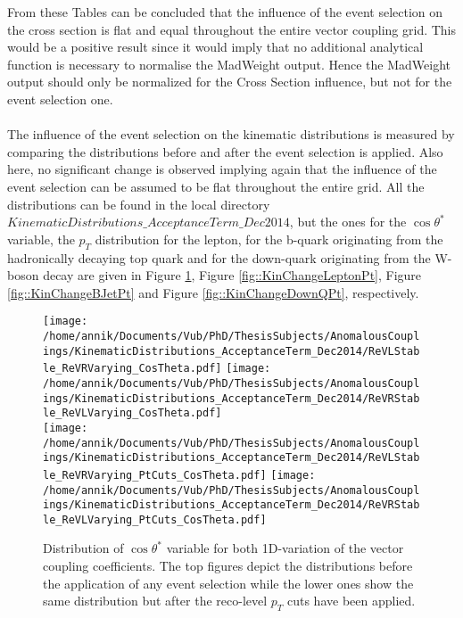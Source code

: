 From these Tables can be concluded that the influence of the event selection on the cross section is flat and equal throughout the entire vector coupling grid. This would be a positive result since it would imply that no additional analytical function is necessary to normalise the MadWeight output. Hence the MadWeight output should only be normalized for the Cross Section influence, but not for the event selection one.\\
\\
The influence of the event selection on the kinematic distributions is measured by comparing the distributions before and after the event selection is applied. Also here, no significant change is observed implying again that the influence of the event selection can be assumed to be flat throughout the entire grid. All the distributions can be found in the local directory $KinematicDistributions\_AcceptanceTerm\_Dec2014$, but the ones for the $\cos \theta^{*}$ variable, the $p_T$ distribution for the lepton, for the b-quark originating from the hadronically decaying top quark and for the down-quark originating from the W-boson decay are given in Figure \ref{fig::KinChangeCosTheta}, Figure \ref{fig::KinChangeLeptonPt}, Figure \ref{fig::KinChangeBJetPt} and Figure \ref{fig::KinChangeDownQPt}, respectively.\\
\begin{figure}[!h]
 \centering
 \texttt{[image: /home/annik/Documents/Vub/PhD/ThesisSubjects/AnomalousCouplings/KinematicDistributions\_AcceptanceTerm\_Dec2014/ReVLStable\_ReVRVarying\_CosTheta.pdf]}
 \texttt{[image: /home/annik/Documents/Vub/PhD/ThesisSubjects/AnomalousCouplings/KinematicDistributions\_AcceptanceTerm\_Dec2014/ReVRStable\_ReVLVarying\_CosTheta.pdf]}\\
 \texttt{[image: /home/annik/Documents/Vub/PhD/ThesisSubjects/AnomalousCouplings/KinematicDistributions\_AcceptanceTerm\_Dec2014/ReVLStable\_ReVRVarying\_PtCuts\_CosTheta.pdf]}
 \texttt{[image: /home/annik/Documents/Vub/PhD/ThesisSubjects/AnomalousCouplings/KinematicDistributions\_AcceptanceTerm\_Dec2014/ReVRStable\_ReVLVarying\_PtCuts\_CosTheta.pdf]}
 \caption{Distribution of $\cos \theta^{*}$ variable for both 1D-variation of the vector coupling coefficients. The top figures depict the distributions before the application of any event selection while the lower ones show the same distribution but after the reco-level $p_T$ cuts have been applied.}
 \label{fig::KinChangeCosTheta}
\end{figure}

